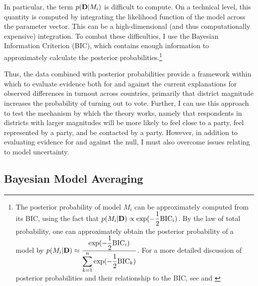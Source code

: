 \documentclass[12pt]{article}
\begin{document}
In particular, the term $p({\bf D} | M_i)$ is difficult to compute. On a technical level, this quantity is computed by integrating the likelihood function of the model across the parameter vector. This can be a high-dimensional (and thus computationally expensive) integration. To combat these difficulties, I use the Bayesian Information Criterion (BIC), which contains enough information to approximately calculate the posterior probabilities.\footnote{The posterior probability of model $M_i$ can be approximately computed from its BIC, using the fact that $p(M_i | {\bf D}) \propto \text{exp}(-\dfrac{1}{2}\text{BIC}_i)$. By the law of total probability, one can approximately obtain the posterior probability of a model by $p(M_i | {\bf D}) \approx \dfrac{\text{exp}(-\dfrac{1}{2}\text{BIC}_i)}{\displaystyle \sum_{k = 1}^n \text{exp}(-\dfrac{1}{2}\text{BIC}_k)}$. For a more detailed discussion of posterior probabilities and their relationship to the BIC, see \cite{Raftery1995} and \cite{KassRaftery1995}}

Thus, the data combined with posterior probabilities provide a framework within which to evaluate evidence both for and against the current explanations for observed differences in turnout across countries, primarily that district magnitude increases the probability of turning out to vote. Further, I can use this approach to test the mechanism by which the theory works, namely that respondents in districts with larger magnitudes will be more likely to feel close to a party, feel represented by a party, and be contacted by a party. However, in addition to evaluating evidence for  and against the null, I must also overcome issues relating to model uncertainty.

\subsection*{Bayesian Model Averaging} 
\end{document}
